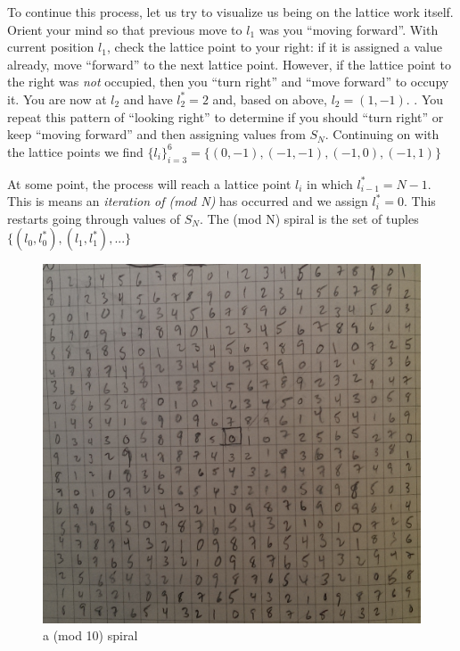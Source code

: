 \documentclass[11pt]{amsart}
\theoremstyle{mydef}
\begin{document}
To continue this process, let us try to visualize us being on the lattice work itself. Orient your mind so that previous move to $l_1$ was you ``moving forward''. With current position $l_1$, check the lattice point to your right: if it is assigned a value already, move ``forward'' to the next lattice point. However, if the lattice point to the right was \emph{not} occupied, then you ``turn right'' and ``move forward'' to occupy it. You are now at $l_2$ and have $l^*_2 = 2$ and, based on above, $l_2 = (1, -1)$. . You repeat this pattern of ``looking right'' to determine if you should ``turn right'' or keep ``moving forward'' and then assigning values from $S_N$. Continuing on with the lattice points we find $\{ l_i \}^{6}_{i=3} = \{  (0, -1), (-1, -1), (-1, 0), (-1, 1) \}$

At some point, the process will reach a lattice point $l_i$ in which $l^*_{i-1} = N-1$. This is means an \textit{iteration of (mod N)} has occurred and we assign $l^*_i = 0$. This restarts going through values of $S_N$. The (mod N) spiral is the set of tuples $\{ (l_0, l^*_0), (l_1, l^*_1), ... \}$ 





\begin{figure}[h]
\centering
\includegraphics[scale=0.3]{mod10.png}
\caption{a (mod 10) spiral}
\label{fig:mod10}
\end{figure}
\end{document}
